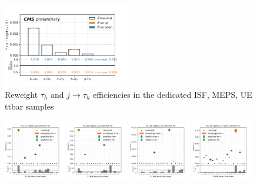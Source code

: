 \begin{figure}
    \includegraphics[width=0.49\textwidth]{appendices/ttSystReweighting/figures/2020_MCRatio_ue_tauGenFlavor_tauVTight.png}
    \caption{Reweight $\tau_h$ and $j \to \tau_h$ efficiencies in the dedicated ISF, MEPS, UE ttbar samples}
    \label{fig:appendix:reweighttt:sf}
\end{figure}


\begin{figure}
    \centering
    \includegraphics[width=0.24\textwidth]{appendices/ttSystReweighting/figures/afterCorr/icata0_ch0_fsr.png}
    \includegraphics[width=0.24\textwidth]{appendices/ttSystReweighting/figures/afterCorr/icata0_ch1_fsr.png}
    \includegraphics[width=0.24\textwidth]{appendices/ttSystReweighting/figures/afterCorr/icata0_ch2_fsr.png}
    \includegraphics[width=0.24\textwidth]{appendices/ttSystReweighting/figures/afterCorr/icata0_ch3_fsr.png}


\end{figure}
